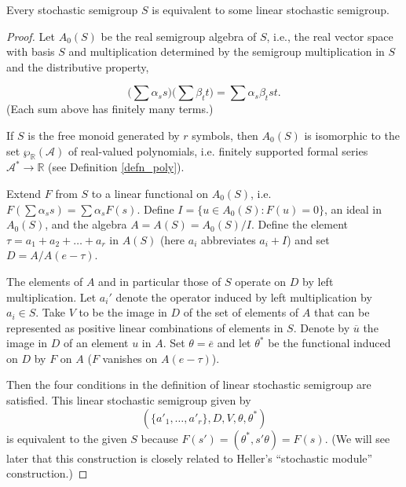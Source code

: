 \documentclass{kepart2010}
\theoremstyle{plain}
\theoremstyle{definition}
\theoremstyle{remark}
\theoremstyle{definition}
\numberwithin{equation}{section}
\begin{document}
\begin{thm}\cite[Theorem 19.1]{Furstenberg1960}
Every stochastic semigroup $S$ is equivalent to some linear
stochastic semigroup.
\end{thm}
\begin{proof}
Let $A_0(S)$ be the real semigroup algebra of $S$, i.e., the real
vector space with basis $S$ and multiplication determined by the
semigroup multiplication in $S$ and the distributive property,

\begin{equation}
\Big(\sum \alpha_{s }s\Big)\Big(\sum \beta_{t }t \Big)= \sum
\alpha_{s }\beta_{t} st .
\end{equation}
(Each sum above has finitely many terms.)

If $S$ is the free monoid generated by $r$ symbols, then
  {
  $A_0(S)$
   is
isomorphic to the set
 $\wp_{\mathbb R}({{\mathcal A}})$ of real-valued polynomials, i.e. finitely supported
 formal series ${{\mathcal A}}^* \to {\mathbb R}$ (see Definition \ref{defn_poly}).}

 Extend $F$ from $S$ to a linear functional on $A_0(S)$, i.e.
$F(\sum \alpha_{s }s)= \sum \alpha_{s }F(s)$. Define $I=\{u\in
A_0(S): F(u)=0\}$, an ideal in
 $A_0(S)$, and the algebra
 {
 $A=A(S)=A_0(S)/I$.
 }
Define the element $\tau = a_1 + a_2 + \dots +a_r$ in $A(S)$ (here
$a_i$ abbreviates $a_i + I$) and set $D= A/A(e-\tau )$.

The elements of $A$ and in particular those of $S$ operate on $D$ by
left multiplication. Let $a_i'$ denote the operator induced by left
multiplication by $a_i \in S$. Take $V$ to be the image in $D$ of
the set of elements of $A$ that can be represented as positive
linear combinations of elements in $S$. Denote by $\overline u$ the
image in $D$ of an element $u$ in $A$. Set $\theta = \overline e$
and let $\theta^*$ be the functional induced on $D$ by $F$ on $A$
($F$ vanishes on $A(e-\tau )$).

Then the four conditions in the definition of linear stochastic
semigroup are satisfied. This linear stochastic semigroup given by
\begin{equation} \label{furstenbergmodule}
(\{a'_1,\dots ,a'_r\}, D,V,\theta ,\theta^*)
\end{equation}
is equivalent to the given $S$ because $F(s ')= (\theta^*,s '\theta)
= F(s )$. (We will see later that this construction is closely
related to
 Heller's ``stochastic module'' construction.)
\end{proof}
\end{document}
